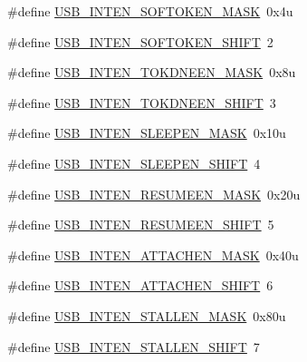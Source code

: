 \begin{DoxyCompactItemize}
\item 
\#define \hyperlink{group___u_s_b___register___masks_ga6398aff7e3278bea66900a35b616563f}{U\+S\+B\+\_\+\+I\+N\+T\+E\+N\+\_\+\+S\+O\+F\+T\+O\+K\+E\+N\+\_\+\+M\+A\+SK}~0x4u
\item 
\#define \hyperlink{group___u_s_b___register___masks_ga8d9738dcc6d852ffd09dbac5e8058431}{U\+S\+B\+\_\+\+I\+N\+T\+E\+N\+\_\+\+S\+O\+F\+T\+O\+K\+E\+N\+\_\+\+S\+H\+I\+FT}~2
\item 
\#define \hyperlink{group___u_s_b___register___masks_ga59b367a1e2496ad06deee9d86001aa7d}{U\+S\+B\+\_\+\+I\+N\+T\+E\+N\+\_\+\+T\+O\+K\+D\+N\+E\+E\+N\+\_\+\+M\+A\+SK}~0x8u
\item 
\#define \hyperlink{group___u_s_b___register___masks_ga2e0c8229886bcca7e35bee00cd90d236}{U\+S\+B\+\_\+\+I\+N\+T\+E\+N\+\_\+\+T\+O\+K\+D\+N\+E\+E\+N\+\_\+\+S\+H\+I\+FT}~3
\item 
\#define \hyperlink{group___u_s_b___register___masks_gac2cf7613141a7333e152b43e42e6ee53}{U\+S\+B\+\_\+\+I\+N\+T\+E\+N\+\_\+\+S\+L\+E\+E\+P\+E\+N\+\_\+\+M\+A\+SK}~0x10u
\item 
\#define \hyperlink{group___u_s_b___register___masks_ga8e3c25dd5e743c21fc277d45640d5a5e}{U\+S\+B\+\_\+\+I\+N\+T\+E\+N\+\_\+\+S\+L\+E\+E\+P\+E\+N\+\_\+\+S\+H\+I\+FT}~4
\item 
\#define \hyperlink{group___u_s_b___register___masks_ga9bcc213c102e47e0700cd463b9198470}{U\+S\+B\+\_\+\+I\+N\+T\+E\+N\+\_\+\+R\+E\+S\+U\+M\+E\+E\+N\+\_\+\+M\+A\+SK}~0x20u
\item 
\#define \hyperlink{group___u_s_b___register___masks_ga49c43d3fce5392a3d68780ebd02cb5df}{U\+S\+B\+\_\+\+I\+N\+T\+E\+N\+\_\+\+R\+E\+S\+U\+M\+E\+E\+N\+\_\+\+S\+H\+I\+FT}~5
\item 
\#define \hyperlink{group___u_s_b___register___masks_gada08eb0b0c86565a19f43a0c9fbf293b}{U\+S\+B\+\_\+\+I\+N\+T\+E\+N\+\_\+\+A\+T\+T\+A\+C\+H\+E\+N\+\_\+\+M\+A\+SK}~0x40u
\item 
\#define \hyperlink{group___u_s_b___register___masks_ga2dcfada22ae8ed86992f14be6ab3f070}{U\+S\+B\+\_\+\+I\+N\+T\+E\+N\+\_\+\+A\+T\+T\+A\+C\+H\+E\+N\+\_\+\+S\+H\+I\+FT}~6
\item 
\#define \hyperlink{group___u_s_b___register___masks_ga18443f2f26840b47e4b4088d25f51c68}{U\+S\+B\+\_\+\+I\+N\+T\+E\+N\+\_\+\+S\+T\+A\+L\+L\+E\+N\+\_\+\+M\+A\+SK}~0x80u
\item 
\#define \hyperlink{group___u_s_b___register___masks_gac8b0e5912467cf86c8a2fcc3c1e98e24}{U\+S\+B\+\_\+\+I\+N\+T\+E\+N\+\_\+\+S\+T\+A\+L\+L\+E\+N\+\_\+\+S\+H\+I\+FT}~7
\item 

\end{DoxyCompactItemize}
